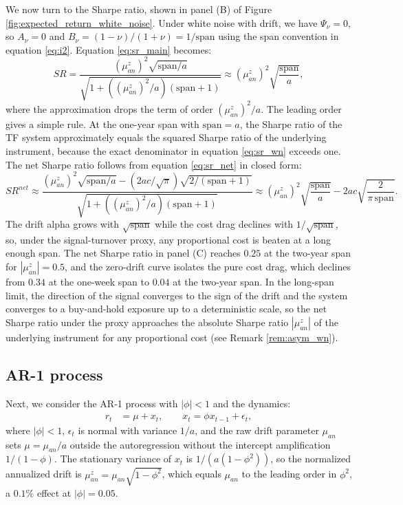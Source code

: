 \documentclass[hidelinks]{siamonline250211}
\newcommand{\spn}{\mathrm{span}}
\begin{document}
We now turn to the Sharpe ratio, shown in panel (B) of Figure \ref{fig:expected_return_white_noise}. Under white noise with drift, we have $\Psi_{\nu}=0$, so $A_{\nu}=0$ and $B_{\nu}=(1-\nu)/(1+\nu)=1/\spn$ using the span convention in equation \eqref{eq:i2}. Equation \eqref{eq:sr_main} becomes:
\begin{equation} \label{eq:sr_wn}
	SR = \frac{ \left(\mu^{z}_{an}\right)^{2} \sqrt{\spn/a} }{ \sqrt{ 1 + \left( \left(\mu^{z}_{an}\right)^{2}/a \right)\left( \spn + 1 \right) } } \approx \left(\mu^{z}_{an}\right)^{2} \sqrt{\frac{\spn}{a}},
\end{equation}
where the approximation drops the term of order $\left(\mu^{z}_{an}\right)^{2}/a$. The leading order gives a simple rule. At the one-year span with $\spn=a$, the Sharpe ratio of the TF system approximately equals the squared Sharpe ratio of the underlying instrument, because the exact denominator in equation \eqref{eq:sr_wn} exceeds one. The net Sharpe ratio follows from equation \eqref{eq:sr_net} in closed form:
\begin{equation} \label{eq:sr_net_wn}
	SR^{net} \approx \frac{ \left(\mu^{z}_{an}\right)^{2} \sqrt{\spn/a} - \left(2ac/\sqrt{\pi}\right) \sqrt{2/(\spn+1)} }{ \sqrt{ 1 + \left( \left(\mu^{z}_{an}\right)^{2}/a \right)\left( \spn + 1 \right) } } \approx \left(\mu^{z}_{an}\right)^{2} \sqrt{\frac{\spn}{a}} - 2ac\sqrt{\frac{2}{\pi\, \spn}}.
\end{equation}
The drift alpha grows with $\sqrt{\spn}$ while the cost drag declines with $1/\sqrt{\spn}$, so, under the signal-turnover proxy, any proportional cost is beaten at a long enough span. The net Sharpe ratio in panel (C) reaches $0.25$ at the two-year span for $|\mu^{z}_{an}|=0.5$, and the zero-drift curve isolates the pure cost drag, which declines from $0.34$ at the one-week span to $0.04$ at the two-year span. In the long-span limit, the direction of the signal converges to the sign of the drift and the system converges to a buy-and-hold exposure up to a deterministic scale, so the net Sharpe ratio under the proxy approaches the absolute Sharpe ratio $|\mu^{z}_{an}|$ of the underlying instrument for any proportional cost (see Remark \ref{rem:asym_wn}).
\subsection{AR-1 process}

Next, we consider the AR-1 process with $|\phi|<1$ and the dynamics:
\begin{equation} \label{eq:a3} 
	\begin{split}
		r_{t} & = \mu + x_{t}, \qquad x_{t} = \phi x_{t-1} + \epsilon_{t},
	\end{split}
\end{equation}
where $\left|\phi\right|<1$, $\epsilon_{t}$ is normal with variance $1/a$, and the raw drift parameter $\mu_{an}$ sets $\mu=\mu_{an}/a$ outside the autoregression without the intercept amplification $1/(1-\phi)$. The stationary variance of $x_{t}$ is $1/(a(1-\phi^{2}))$, so the normalized annualized drift is $\mu^{z}_{an} = \mu_{an}\sqrt{1-\phi^{2}}$, which equals $\mu_{an}$ to the leading order in $\phi^{2}$, a $0.1\%$ effect at $|\phi|=0.05$.
\end{document}

